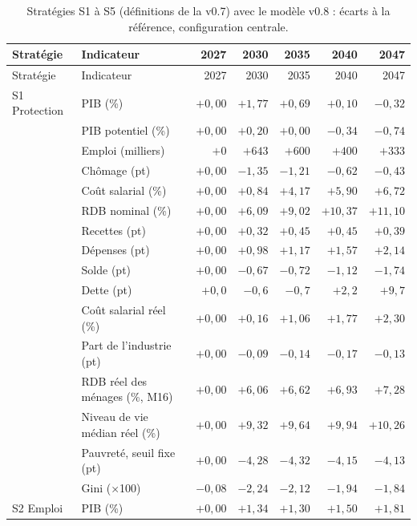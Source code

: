 \begin{longtable}{llrrrrr}\caption{Stratégies S1 à S5 (définitions de la v0.7) avec le modèle v0.8 : écarts à la référence, configuration centrale.}\label{tab:strat_horizons}\\ \toprule Stratégie & Indicateur & 2027 & 2030 & 2035 & 2040 & 2047\\ \midrule\endfirsthead \toprule Stratégie & Indicateur & 2027 & 2030 & 2035 & 2040 & 2047\\ \midrule\endhead
S1 Protection & PIB (\%) & $+0{,}00$ & $+1{,}77$ & $+0{,}69$ & $+0{,}10$ & $-0{,}32$\\
 & PIB potentiel (\%) & $+0{,}00$ & $+0{,}20$ & $+0{,}00$ & $-0{,}34$ & $-0{,}74$\\
 & Emploi (milliers) & $+0$ & $+643$ & $+600$ & $+400$ & $+333$\\
 & Chômage (pt) & $+0{,}00$ & $-1{,}35$ & $-1{,}21$ & $-0{,}62$ & $-0{,}43$\\
 & Coût salarial (\%) & $+0{,}00$ & $+0{,}84$ & $+4{,}17$ & $+5{,}90$ & $+6{,}72$\\
 & RDB nominal (\%) & $+0{,}00$ & $+6{,}09$ & $+9{,}02$ & $+10{,}37$ & $+11{,}10$\\
 & Recettes (pt) & $+0{,}00$ & $+0{,}32$ & $+0{,}45$ & $+0{,}45$ & $+0{,}39$\\
 & Dépenses (pt) & $+0{,}00$ & $+0{,}98$ & $+1{,}17$ & $+1{,}57$ & $+2{,}14$\\
 & Solde (pt) & $+0{,}00$ & $-0{,}67$ & $-0{,}72$ & $-1{,}12$ & $-1{,}74$\\
 & Dette (pt) & $+0{,}0$ & $-0{,}6$ & $-0{,}7$ & $+2{,}2$ & $+9{,}7$\\
 & Coût salarial réel (\%) & $+0{,}00$ & $+0{,}16$ & $+1{,}06$ & $+1{,}77$ & $+2{,}30$\\
 & Part de l'industrie (pt) & $+0{,}00$ & $-0{,}09$ & $-0{,}14$ & $-0{,}17$ & $-0{,}13$\\
 & RDB réel des ménages (\%, M16) & $+0{,}00$ & $+6{,}06$ & $+6{,}62$ & $+6{,}93$ & $+7{,}28$\\
 & Niveau de vie médian réel (\%) & $+0{,}00$ & $+9{,}32$ & $+9{,}64$ & $+9{,}94$ & $+10{,}26$\\
 & Pauvreté, seuil fixe (pt) & $+0{,}00$ & $-4{,}28$ & $-4{,}32$ & $-4{,}15$ & $-4{,}13$\\
 & Gini (×100) & $-0{,}08$ & $-2{,}24$ & $-2{,}12$ & $-1{,}94$ & $-1{,}84$\\
\addlinespace
S2 Emploi & PIB (\%) & $+0{,}00$ & $+1{,}34$ & $+1{,}30$ & $+1{,}50$ & $+1{,}81$\\

\end{longtable}
